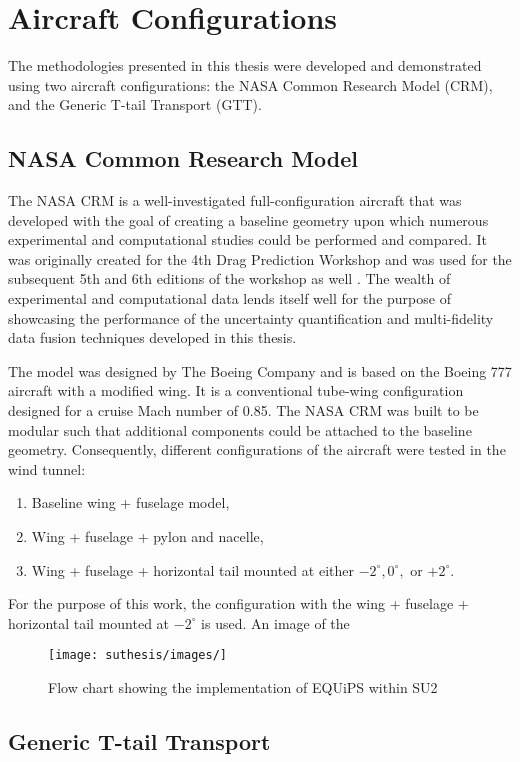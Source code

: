 \section{Aircraft Configurations}

The methodologies presented in this thesis were developed and demonstrated using two aircraft configurations: the NASA Common Research Model (CRM), and the Generic T-tail Transport (GTT). 

\subsection{NASA Common Research Model}
The NASA CRM is a well-investigated full-configuration aircraft \cite{rivers_further_2012,rivers_experimental_2010} that was developed with the goal of creating a baseline geometry upon which numerous experimental and computational studies could be performed and compared.
It was originally created for the 4th Drag Prediction Workshop \cite{morrison20094th} and was used for the subsequent 5th and 6th editions of the workshop as well \cite{levy2013summary,morrison20166th,roy2017summary,tinoco2017summary}.
The wealth of experimental and computational data lends itself well for the purpose of showcasing the performance of the uncertainty quantification and multi-fidelity data fusion techniques developed in this thesis.

The model was designed by The Boeing Company and is based on the Boeing 777 aircraft with a modified wing. 
It is a conventional tube-wing configuration designed for a cruise Mach number of 0.85.
The NASA CRM was built to be modular such that additional components could be attached to the baseline geometry. 
Consequently, different configurations of the aircraft were tested in the wind tunnel:
\begin{enumerate}
    \item Baseline wing + fuselage model,
    \item Wing + fuselage + pylon and nacelle,
    \item Wing + fuselage + horizontal tail mounted at either $-2^\circ, 0^\circ,$ or $+2^\circ$.
\end{enumerate}
For the purpose of this work, the configuration with the wing + fuselage + horizontal tail mounted at $-2^\circ$ is used. 
An image of the 

\begin{figure}
\centering
\texttt{[image: suthesis/images/]}
\caption{Flow chart showing the implementation of EQUiPS within SU2 \label{fig:equips_overview}}
\end{figure}

\subsection{Generic T-tail Transport}